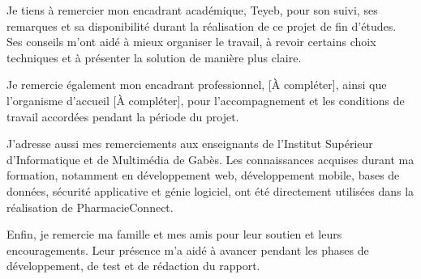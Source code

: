 Je tiens à remercier mon encadrant académique, Teyeb, pour son suivi, ses remarques et sa disponibilité
durant la réalisation de ce projet de fin d'études. Ses conseils m'ont aidé à mieux organiser le travail,
à revoir certains choix techniques et à présenter la solution de manière plus claire.

Je remercie également mon encadrant professionnel, [À compléter], ainsi que l'organisme d'accueil
[À compléter], pour l'accompagnement et les conditions de travail accordées pendant la période du
projet.

J'adresse aussi mes remerciements aux enseignants de l'Institut Supérieur d'Informatique et de
Multimédia de Gabès. Les connaissances acquises durant ma formation, notamment en développement web,
développement mobile, bases de données, sécurité applicative et génie logiciel, ont été directement
utilisées dans la réalisation de PharmacieConnect.

Enfin, je remercie ma famille et mes amis pour leur soutien et leurs encouragements. Leur présence m'a
aidé à avancer pendant les phases de développement, de test et de rédaction du rapport.
